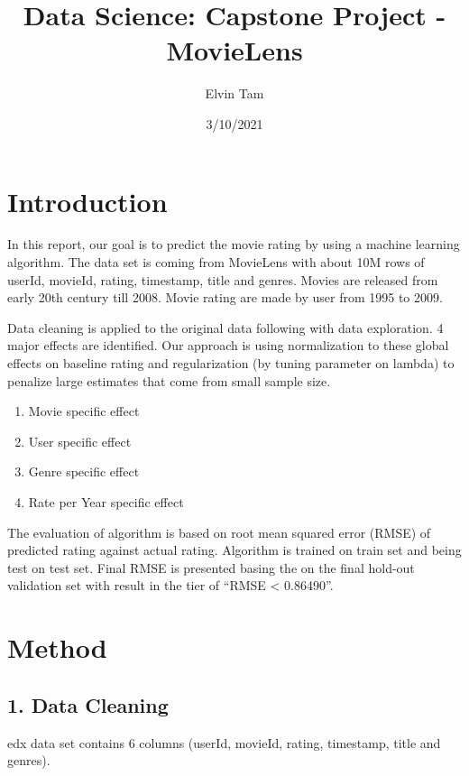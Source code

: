 \documentclass[
]{article}
\title{Data Science: Capstone Project - MovieLens}
\author{Elvin Tam}
\date{3/10/2021}
\providecommand{\tightlist}{%
  \setlength{\itemsep}{0pt}\setlength{\parskip}{0pt}}
\begin{document}
\maketitle

\hypertarget{introduction}{%
\section{Introduction}\label{introduction}}

In this report, our goal is to predict the movie rating by using a
machine learning algorithm. The data set is coming from MovieLens with
about 10M rows of userId, movieId, rating, timestamp, title and genres.
Movies are released from early 20th century till 2008. Movie rating are
made by user from 1995 to 2009.

Data cleaning is applied to the original data following with data
exploration. 4 major effects are identified. Our approach is using
normalization to these global effects on baseline rating and
regularization (by tuning parameter on lambda) to penalize large
estimates that come from small sample size.

\begin{enumerate}
\def\labelenumi{\arabic{enumi}.}
\tightlist
\item
  Movie specific effect
\item
  User specific effect
\item
  Genre specific effect
\item
  Rate per Year specific effect
\end{enumerate}

The evaluation of algorithm is based on root mean squared error (RMSE)
of predicted rating against actual rating. Algorithm is trained on train
set and being test on test set. Final RMSE is presented basing the on
the final hold-out validation set with result in the tier of ``RMSE
\textless{} 0.86490''.

\hypertarget{method}{%
\section{Method}\label{method}}

\hypertarget{data-cleaning}{%
\subsection{1. Data Cleaning}\label{data-cleaning}}

edx data set contains 6 columns (userId, movieId, rating, timestamp,
title and genres).
\end{document}
